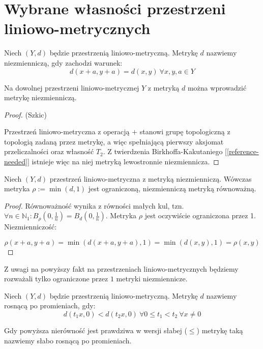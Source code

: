 \section{Wybrane własności przestrzeni liniowo-metrycznych}

\begin{df}
  Niech $(Y, d)$ będzie przestrzenią liniowo-metryczną. Metrykę $d$ nazwiemy niezmienniczą, gdy zachodzi warunek:
  \[d(x+a, y+a) = d(x,y)\ \forall x, y, a \in Y\] 
\end{df}


\begin{fact}
  Na dowolnej przestrzeni liniowo-metrycznej $Y$ z metryką $d$ można wprowadzić metrykę niezmienniczą.
  
  \begin{proof}(Szkic)
  
  Przestrzeń liniowo-metryczna z operacją $+$ stanowi grupę topologiczną z topologią zadaną przez metrykę, a więc spełniającą pierwszy aksjomat przeliczalności oraz własność $T_2$. Z twierdzenia Birkhoffa-Kakutaniego [\ref{reference-needed}] istnieje więc na niej metryką lewostronnie niezmiennicza.
  \end{proof}
\end{fact}

\begin{note}
  Niech $(Y, d)$ przestrzeń liniowo-metryczna z metryką niezmienniczą. Wówczas metryka $\rho := \min(d, 1)$ jest ograniczoną, niezmienniczą metryką równoważną.
  \begin{proof}
    Równoważność wynika z równości małych kul, tzn. $\forall n \in \mathbb{N}_1: B_\rho(0, \frac{1}{n}) = B_d(0, \frac{1}{n})$. Metryka $\rho$ jest oczywiście ograniczona przez 1. Niezmienniczość:
    
    \[\rho(x+a, y+a) = \min(d(x+a, y+a), 1) = \min(d(x,y), 1) = \rho(x,y)\]
  \end{proof}
\end{note}


Z uwagi na powyższy fakt na przestrzeniach liniowo-metrycznych będziemy rozważali tylko ograniczone przez $1$ metryki niezmiennicze.

\begin{df}
  Niech $(Y, d)$ będzie przestrzenią liniowo-metryczną. Metrykę $d$ nazwiemy rosnącą po promieniach, gdy:
  \[d(t_1 x, 0) < d(t_2 x, 0)\ \forall 0 \leq t_1 < t_2\ \forall x \neq 0\]
  
  Gdy powyższa nierówność jest prawdziwa w wersji słabej ($\leq$) metrykę taką nazwiemy słabo rosnącą po promieniach.
\end{df}

